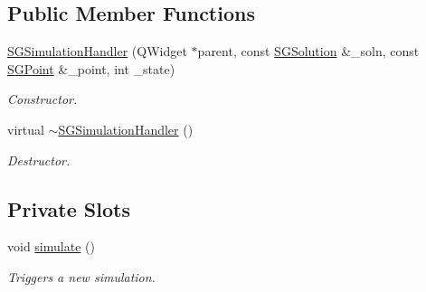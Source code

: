 \subsection*{Public Member Functions}
\begin{DoxyCompactItemize}
\item 
\mbox{\label{classSGSimulationHandler_a41ff94a3450b8b899cd56915a4415fd1}} 
\hyperlink{classSGSimulationHandler_a41ff94a3450b8b899cd56915a4415fd1}{S\+G\+Simulation\+Handler} (Q\+Widget $\ast$parent, const \hyperlink{classSGSolution}{S\+G\+Solution} \&\+\_\+soln, const \hyperlink{classSGPoint}{S\+G\+Point} \&\+\_\+point, int \+\_\+state)
\begin{DoxyCompactList}\small\item\em Constructor. \end{DoxyCompactList}\item 
\mbox{\label{classSGSimulationHandler_aed14fbcb2532d3a0f7ebe42e110c090e}} 
virtual \hyperlink{classSGSimulationHandler_aed14fbcb2532d3a0f7ebe42e110c090e}{$\sim$\+S\+G\+Simulation\+Handler} ()
\begin{DoxyCompactList}\small\item\em Destructor. \end{DoxyCompactList}\end{DoxyCompactItemize}
\subsection*{Private Slots}
\begin{DoxyCompactItemize}
\item 
void \hyperlink{classSGSimulationHandler_a37b1504ddf71de0160cbac4f17788f8c}{simulate} ()
\begin{DoxyCompactList}\small\item\em Triggers a new simulation. \end{DoxyCompactList}\end{DoxyCompactItemize}
